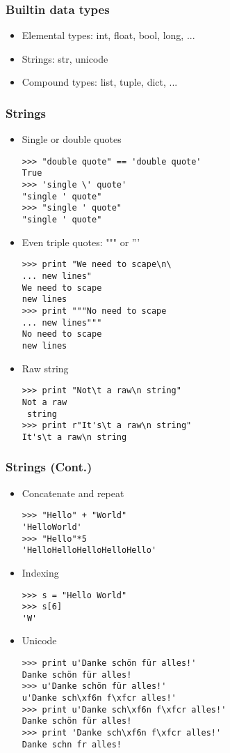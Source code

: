 \begin{frame}
  \frametitle{Builtin data types}
  \begin{itemize}
  \item Elemental types: int, float, bool, long, ...
  \item Strings: str, unicode
  \item Compound types: list, tuple, dict, ...
  \end{itemize}
\end{frame}

\begin{frame}[fragile]
  \frametitle{Strings}
  \begin{itemize}
  \item Single or double quotes
{\scriptsize
\begin{verbatim}
>>> "double quote" == 'double quote'
True
>>> 'single \' quote'
"single ' quote"
>>> "single ' quote"
"single ' quote"
\end{verbatim}
}

\item Even triple quotes: """ or '''
{\scriptsize
\begin{verbatim}
>>> print "We need to scape\n\
... new lines"
We need to scape
new lines
>>> print """No need to scape
... new lines"""
No need to scape
new lines
\end{verbatim}
}  

\item Raw string
{\scriptsize
\begin{verbatim}
>>> print "Not\t a raw\n string"
Not a raw
 string
>>> print r"It's\t a raw\n string"
It's\t a raw\n string
\end{verbatim}
}
\end{itemize}
\end{frame}

\begin{frame}[fragile]
  \frametitle{Strings (Cont.)}
  \begin{itemize}
  \item Concatenate and repeat
{\scriptsize
\begin{verbatim}
>>> "Hello" + "World"
'HelloWorld'
>>> "Hello"*5
'HelloHelloHelloHelloHello'
\end{verbatim}
}

\item Indexing
{\scriptsize
\begin{verbatim}
>>> s = "Hello World"
>>> s[6]
'W'
\end{verbatim}
}

\item Unicode
{\scriptsize
\begin{verbatim}
>>> print u'Danke schön für alles!'
Danke schön für alles!
>>> u'Danke schön für alles!'
u'Danke sch\xf6n f\xfcr alles!'
>>> print u'Danke sch\xf6n f\xfcr alles!'
Danke schön für alles!
>>> print 'Danke sch\xf6n f\xfcr alles!'
Danke schn fr alles!
\end{verbatim}
}

\end{itemize}
\end{frame}

